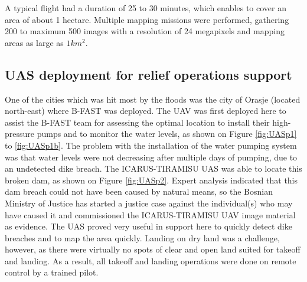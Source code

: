 \documentclass{article}
\begin{document}
A typical flight had a duration of 25 to 30 minutes, which enables to cover an area of about 1 hectare. Multiple mapping missions were performed, gathering 200 to maximum 500 images with a resolution of 24 megapixels and mapping areas as large as $1km^2$.

\subsection{UAS deployment for relief operations support}
One of the cities which was hit most by the floods was the city of Orasje (located north-east) where B-FAST was deployed.
The UAV was first deployed here to assist the B-FAST team for assessing the optimal location to install their high-pressure pumps and to monitor the water levels, as shown on Figure \ref{fig:UASp1} to \ref{fig:UASp1b}.
The problem with the installation of the water pumping system was that water levels were not decreasing after multiple days of pumping, due to an undetected dike breach.
The ICARUS-TIRAMISU UAS was able to locate this broken dam, as shown on Figure \ref{fig:UASp2}.
Expert analysis indicated that this dam breach could not have been caused by natural means, so the Bosnian Ministry of Justice has started a justice case against the individual(s) who may have caused it and commissioned the ICARUS-TIRAMISU UAV image material as evidence.
The UAS proved very useful in support here to quickly detect dike breaches and to map the area quickly. Landing on dry land was a challenge, however, as there were virtually no spots of clear and open land suited for takeoff and landing.
As a result, all takeoff and landing operations were done on remote control by a trained pilot.
\end{document}
